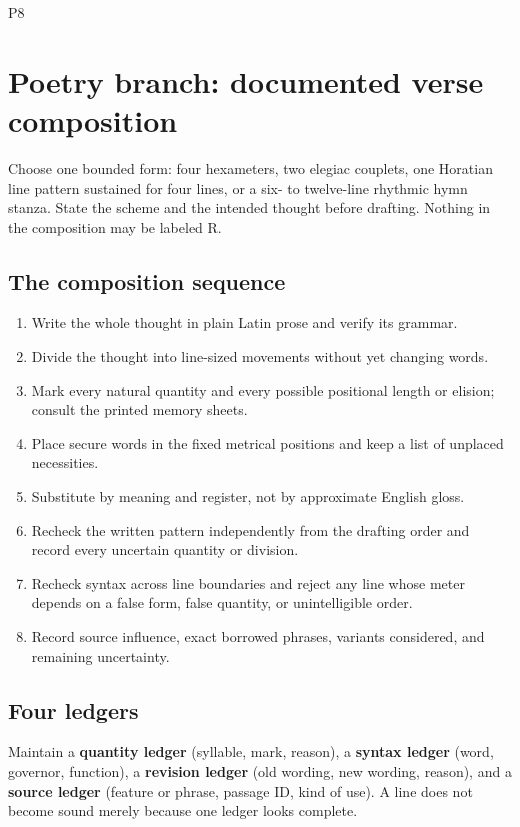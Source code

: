 \begin{courseunit}{P8}
\chapter{Poetry branch: documented verse composition}

Choose one bounded form: four hexameters, two elegiac couplets, one Horatian
line pattern sustained for four lines, or a six- to twelve-line rhythmic hymn
stanza. State the scheme and the intended thought before drafting. Nothing in
the composition may be labeled R.

\section{The composition sequence}

\begin{enumerate}
\item Write the whole thought in plain Latin prose and verify its grammar.
\item Divide the thought into line-sized movements without yet changing words.
\item Mark every natural quantity and every possible positional length or
elision; consult the printed memory sheets.
\item Place secure words in the fixed metrical positions and keep a list of
unplaced necessities.
\item Substitute by meaning and register, not by approximate English gloss.
\item Recheck the written pattern independently from the drafting order and
record every uncertain quantity or division.
\item Recheck syntax across line boundaries and reject any line whose meter
depends on a false form, false quantity, or unintelligible order.
\item Record source influence, exact borrowed phrases, variants considered,
and remaining uncertainty.
\end{enumerate}

\section{Four ledgers}

Maintain a \textbf{quantity ledger} (syllable, mark, reason), a
\textbf{syntax ledger} (word, governor, function), a \textbf{revision ledger}
(old wording, new wording, reason), and a \textbf{source ledger} (feature or
phrase, passage ID, kind of use). A line does not become sound merely because
one ledger looks complete.


\end{courseunit}
